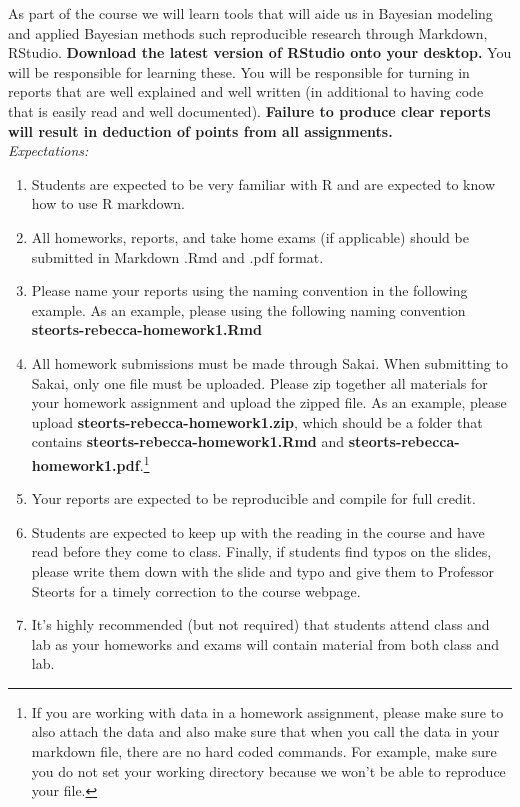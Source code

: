 \documentclass[11pt]{article}
\begin{document}
As part of the course we will learn tools that will aide us in Bayesian modeling and applied Bayesian methods such reproducible research through Markdown, RStudio. \textbf{Download the latest version of RStudio onto your desktop.} You will be responsible for learning these. You will be responsible for turning in reports that are well explained and well written (in additional to having code that is easily read and well documented). \textbf{Failure to produce clear reports will result in deduction of points from all assignments.} 
\\
\newpage
\emph{Expectations:} 
\begin{enumerate}
\item Students are expected to be very familiar with R and are expected to know how to use R markdown. 
\item All homeworks, reports, and take home exams (if applicable) should be submitted in Markdown .Rmd and .pdf format. 
\item Please name your reports using the naming convention in the following example. As an example, please using the following naming convention \textbf{steorts-rebecca-homework1.Rmd} 
\item All homework submissions must be made through Sakai. When submitting to Sakai, only one file must be uploaded. Please zip together all materials for your homework assignment and upload the zipped file. As an example, please upload \textbf{steorts-rebecca-homework1.zip}, which should be a folder that contains \textbf{steorts-rebecca-homework1.Rmd}  and \textbf{steorts-rebecca-homework1.pdf}.\footnote{If you are working with data in a homework assignment, please make sure to also attach the data and also make sure that when you call the data in your markdown file, there are no hard coded commands. For example, make sure you do not set your working directory because we won't be able to reproduce your file.}
\item Your reports are expected to be reproducible and compile for full credit. 
\item Students are expected to keep up with the reading in the course and have read before they come to class. Finally, if students find typos on the slides, please write them down with the slide and typo and give them to Professor Steorts for a timely correction to the course webpage.  
\item It's highly recommended (but not required) that students attend class and lab as your homeworks and exams will contain material from both class and lab. 
\end{enumerate}
\end{document}
